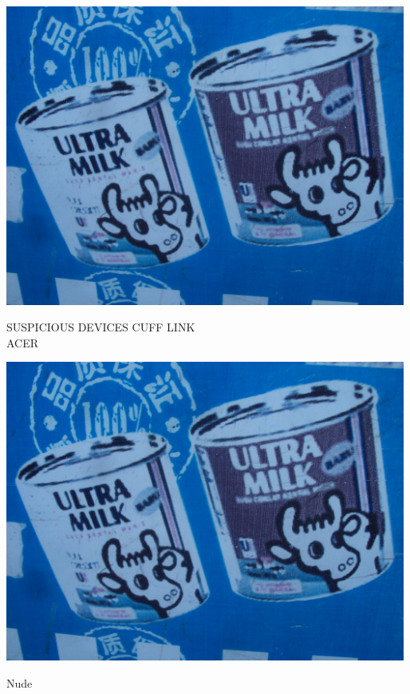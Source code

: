 \documentclass[10pt,letterpaper]{article}
\begin{document}
\vspace{0.25in}
\includegraphics[width=5.19in]{landscape.jpg}

SUSPICIOUS DEVICES CUFF LINK\\
ACER\\
\pagebreak

\includegraphics[width=5.19in]{landscape.jpg}

Nude\\
\pagebreak
\end{document}

